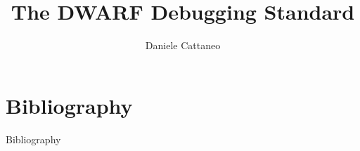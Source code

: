 

\author{Daniele Cattaneo}
\date{\DATE}
\title{The DWARF Debugging Standard}
\newcommand{\customdata}{Daniele Cattaneo <daniele.cattaneo@polimi.it>}





\begin{frame}
\maketitle
\end{frame}










\section*{Bibliography}
\begin{frame}[allowframebreaks]{Bibliography}
\nocite{*}


\end{frame}


